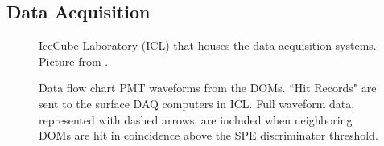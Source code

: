 \subsection{Data Acquisition}

\begin{figure}
    \caption{IceCube Laboratory (ICL) that houses the data acquisition systems. Picture from \cite{IceCube_SPGallery}.}
    \label{fig:ICL}
\end{figure}

\begin{figure}
    \caption{Data flow chart PMT waveforms from the DOMs. “Hit Records" are sent to the surface DAQ computers in ICL. Full waveform data, represented with dashed arrows, are included when neighboring DOMs are hit in coincidence above the SPE discriminator threshold.}
    \label{fig:IC3_dataflow}
\end{figure}

